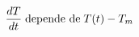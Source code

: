 \documentclass[preview]{standalone}
\begin{document}
\begin{align*}
\special{dvisvgm:raw <g id='unique000'>}\frac{dT}{dt} \;\text{depende de}\; T(t) - T_m\special{dvisvgm:raw </g>}
\end{align*}
\end{document}
